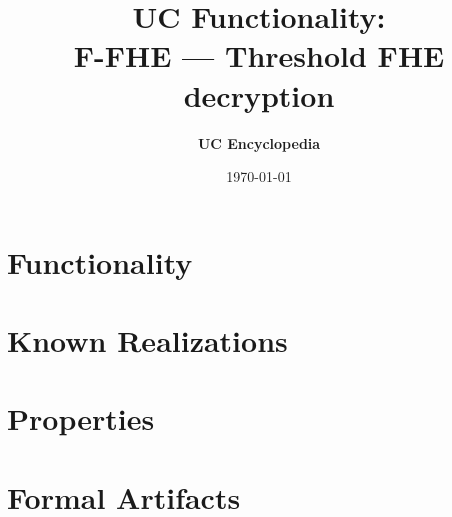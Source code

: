 \documentclass[11pt,a4paper]{article}
\title{\textbf{\Large UC Functionality:}\\[0.2em] \Large F-FHE --- Threshold FHE decryption}
\author{\textbf{UC Encyclopedia}}
\date{\today}
\newtheorem{functionality}{Functionality}
\begin{document}
\maketitle

\begin{abstract}
\end{abstract}

\section{Functionality}

%

\section{Known Realizations}


\section{Properties}


\section{Formal Artifacts}

\end{document}
